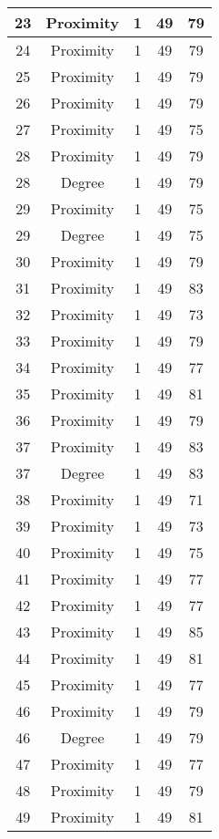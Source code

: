 \documentclass[results.tex]{subfiles}
\begin{document}
\begin{center}
\begin{tabular}{| c || c | c | c | c |}
    \hline
    23 & Proximity & 1 & 49 & 79 \\ 
    \hline
    24 & Proximity & 1 & 49 & 79 \\ 
    \hline
    25 & Proximity & 1 & 49 & 79 \\ 
    \hline
    26 & Proximity & 1 & 49 & 79 \\ 
    \hline
    27 & Proximity & 1 & 49 & 75 \\ 
    \hline
    28 & Proximity & 1 & 49 & 79 \\ 
    \hline
    28 & Degree & 1 & 49 & 79 \\ 
    \hline
    29 & Proximity & 1 & 49 & 75 \\ 
    \hline
    29 & Degree & 1 & 49 & 75 \\ 
    \hline
    30 & Proximity & 1 & 49 & 79 \\ 
    \hline
    31 & Proximity & 1 & 49 & 83 \\ 
    \hline
    32 & Proximity & 1 & 49 & 73 \\ 
    \hline
    33 & Proximity & 1 & 49 & 79 \\ 
    \hline
    34 & Proximity & 1 & 49 & 77 \\ 
    \hline
    35 & Proximity & 1 & 49 & 81 \\ 
    \hline
    36 & Proximity & 1 & 49 & 79 \\ 
    \hline
    37 & Proximity & 1 & 49 & 83 \\ 
    \hline
    37 & Degree & 1 & 49 & 83 \\ 
    \hline
    38 & Proximity & 1 & 49 & 71 \\ 
    \hline
    39 & Proximity & 1 & 49 & 73 \\ 
    \hline
    40 & Proximity & 1 & 49 & 75 \\ 
    \hline
    41 & Proximity & 1 & 49 & 77 \\ 
    \hline
    42 & Proximity & 1 & 49 & 77 \\ 
    \hline
    43 & Proximity & 1 & 49 & 85 \\ 
    \hline
    44 & Proximity & 1 & 49 & 81 \\ 
    \hline
    45 & Proximity & 1 & 49 & 77 \\ 
    \hline
    46 & Proximity & 1 & 49 & 79 \\ 
    \hline
    46 & Degree & 1 & 49 & 79 \\ 
    \hline
    47 & Proximity & 1 & 49 & 77 \\ 
    \hline
    48 & Proximity & 1 & 49 & 79 \\ 
    \hline
    49 & Proximity & 1 & 49 & 81 \\ 
    \hline   \end{tabular}
\end{center}
\end{document}
